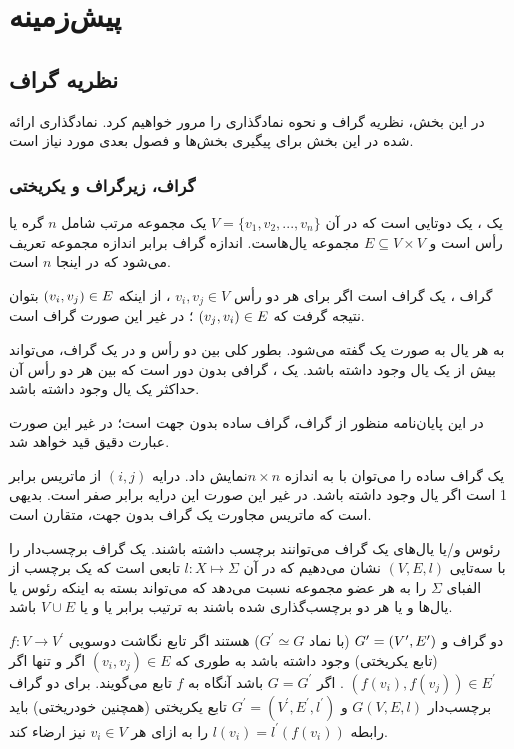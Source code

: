 \chapter{پیش‌زمینه}\label{chap:prerequisites}
\section{نظریه گراف}
در این بخش، نظریه گراف و نحوه نمادگذاری‌ را مرور خواهیم کرد. نمادگذاری ارائه شده در این بخش برای پیگیری بخش‌ها و فصول بعدی مورد نیاز است.

\subsection{گراف، زیرگراف و یکریختی}
یک ، یک دوتایی  است که در آن
$V = \{v_{1},v_{2},...,v_{n}\}$
یک مجموعه مرتب شامل $n$ گره‌ یا رأس است و
$E \subseteq V\times V$
مجموعه یال‌هاست. اندازه گراف برابر اندازه مجموعه \V تعریف می‌شود که در اینجا $n$ است.

گراف ، یک گراف  است اگر برای هر دو رأس
$v_{i},v_{j} \in V$
، از اینکه
$(v_{i},v_{j}) \in E$
بتوان نتیجه گرفت که
$(v_{j},v_{i}) \in E$
؛ در غیر این صورت گراف  است.

به هر یال به صورت 
یک  گفته می‌شود. بطور کلی بین دو رأس \Vi و \Vj در یک گراف، می‌تواند بیش از یک یال وجود داشته باشد. یک ، گرافی بدون دور است که بین هر دو رأس آن حداکثر یک یال وجود داشته باشد.

در این پایان‌نامه منظور از گراف، گراف ساده بدون جهت است؛ در غیر این صورت عبارت دقیق قید خواهد شد.

یک گراف ساده را می‌توان با  \A به اندازه $n\times n$نمایش داد. درایه $(i,j)$ از ماتریس \A برابر 1 است اگر یال  وجود داشته باشد. در غیر این صورت این درایه برابر صفر است. بدیهی است که ماتریس مجاورت یک گراف بدون جهت، متقارن است.

رئوس و/یا یال‌های یک گراف می‌توانند برچسب داشته باشند. یک گراف برچسب‌دار را با سه‌تایی $(V,E,l)$ نشان می‌دهیم که در آن $l: X \mapsto \Sigma$ تابعی است که یک برچسب از الفبای $\Sigma$ را به هر عضو مجموعه \X نسبت می‌دهد که \X می‌تواند بسته به اینکه رئوس یا یال‌ها و یا هر دو برچسب‌گذاری شده باشند به ترتیب برابر \V یا \E و یا $V\cup E$ باشد.

دو گراف  و
$G^{\prime} = (V^{\prime},E^{\prime})$
 (با نماد $G^{\prime} \simeq G$) هستند اگر تابع نگاشت دوسویی $f: V \rightarrow V^{\prime}$ (تابع یکریختی) وجود داشته باشد به طوری که
$(v_{i},v_{j}) \in E$
اگر و تنها اگر
$(f(v_{i}),f(v_{j})) \in E^{\prime}$
. اگر $G = G^{\prime}$ باشد آنگاه به $f$ تابع  می‌گویند. برای دو گراف برچسب‌دار $G(V,E,l)$ و $G^{\prime} = (V^{\prime},E^{\prime},l^{\prime})$ تابع یکریختی (همچنین خودریختی) باید رابطه 
$l(v_{i}) = l^{\prime}(f(v_{i}))$
 را به ازای هر $v_{i} \in V$ نیز ارضاء کند.
 
